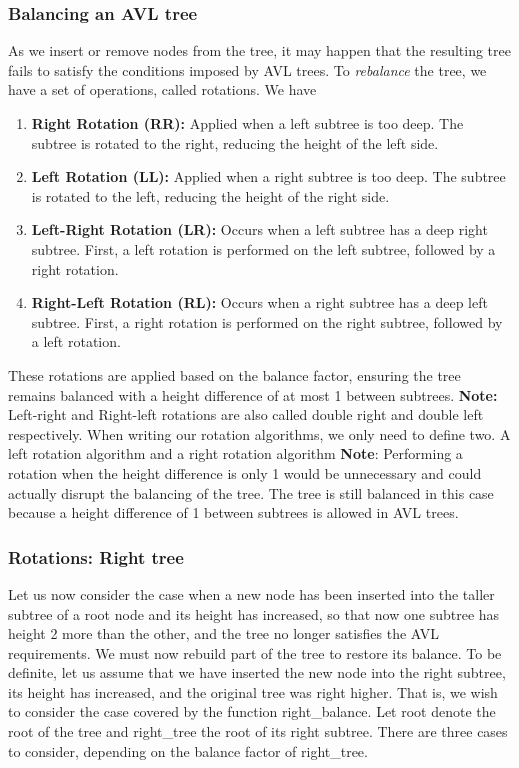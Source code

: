 \documentclass{report}
\begin{document}
\bigbreak \noindent 
\subsubsection{Balancing an AVL tree}
\bigbreak \noindent 
As we insert or remove nodes from the tree, it may happen that the resulting tree fails to satisfy the conditions imposed by AVL trees. To \textit{rebalance} the tree, we have a set of operations, called rotations. We have
\bigbreak \noindent 
\begin{enumerate}
    \item \textbf{Right Rotation (RR):} Applied when a left subtree is too deep. The subtree is rotated to the right, reducing the height of the left side.
    \item \textbf{Left Rotation (LL):} Applied when a right subtree is too deep. The subtree is rotated to the left, reducing the height of the right side.
    \item \textbf{Left-Right Rotation (LR):} Occurs when a left subtree has a deep right subtree. First, a left rotation is performed on the left subtree, followed by a right rotation.
    \item \textbf{Right-Left Rotation (RL):} Occurs when a right subtree has a deep left subtree. First, a right rotation is performed on the right subtree, followed by a left rotation.
\end{enumerate}
These rotations are applied based on the balance factor, ensuring the tree remains balanced with a height difference of at most 1 between subtrees.
\bigbreak \noindent 
\textbf{Note:} Left-right and Right-left rotations are also called double right and double left respectively.
\bigbreak \noindent 
When writing our rotation algorithms, we only need to define two. A left rotation algorithm and a right rotation algorithm
\bigbreak \noindent 
\textbf{Note}: Performing a rotation when the height difference is only 1 would be unnecessary and could actually disrupt the balancing of the tree. The tree is still balanced in this case because a height difference of 1 between subtrees is allowed in AVL trees.

\pagebreak 
\subsubsection{Rotations: Right tree}
\bigbreak \noindent 
Let us now consider the case when a new node has been inserted into the taller subtree of a root node and its height has increased, so that now one subtree has height 2 more than the other, and the tree no longer satisfies the AVL requirements. We must now rebuild part of the tree to restore its balance. To be definite, let us assume that we have inserted the new node into the right subtree, its height has increased, and the original tree was right higher. That is, we wish to consider the case covered by the function right\_balance. Let root denote the root of the tree and right\_tree the root of its right subtree.
\bigbreak \noindent 
There are three cases to consider, depending on the balance factor of right\_tree.
\bigbreak \noindent 
\end{document}
